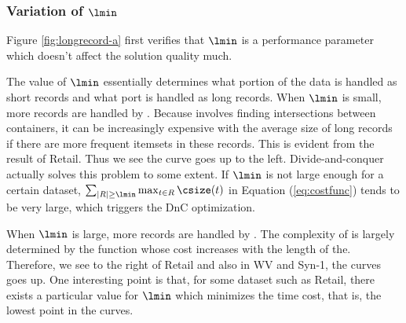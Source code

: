 \subsubsection{Variation of $\lmin$ }\label{sec:eval:longrecord}
Figure \ref{fig:longrecord-a} first verifies that $\lmin$ is a performance
parameter which doesn't affect the solution quality much.

The value of $\lmin$ essentially determines what portion of the data is handled
as short records and what port is handled as long records.
When $\lmin$ is small, more records are handled by \HandleLongRecord.
Because \HandleLongRecord involves finding intersections between \qid
containers, it can be increasingly expensive with the average size of
long records if there are more frequent itemsets in these records.
This is evident from the result of Retail. Thus we see the
curve goes up to the left.
Divide-and-conquer actually solves this problem to some extent.
If $\lmin$ is not large enough for a certain dataset,
$\sum_{|R| \ge \lmin}\max_{t \in R} \csize(t)$ in Equation (\ref{eq:costfunc})
tends to be very large, which triggers the DnC optimization.

When $\lmin$ is large, more records are handled by \HandleShortRecords.
The complexity of \HandleShortRecords is largely determined by the \Enum function
whose cost increases with the length of the\qids. Therefore, we see to the right
of Retail and also in WV and Syn-1, the curves goes up. One interesting point is
that, for some dataset such as Retail, there exists a particular value
for $\lmin$ which minimizes the time cost, that is, the lowest point in the curves.
%

